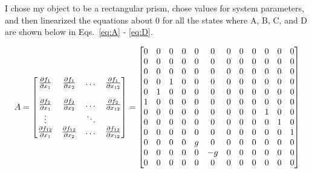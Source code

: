 \documentclass{article}
\begin{document}
I chose my object to be a rectangular prism, chose values for system parameters, and then linearized the equations about 0 for all the states where A, B, C, and D are shown below in Eqs.~\ref{eq:A} - \ref{eq:D}.

\begin{equation}\label{eq:A}
A=
  \begin{bmatrix}
    \frac{\partial f_1}{\partial x_1} & \frac{\partial f_1}{\partial x_2} & \dots  & \frac{\partial f_1}{\partial x_{12}} \\ \\
    \frac{\partial f_2}{\partial x_1} & \frac{\partial f_2}{\partial x_2} & \dots  & \frac{\partial f_2}{\partial x_{12}} \\
    \vdots &  & \ddots  &  \\
    \frac{\partial f_{12}}{\partial x_1} & \frac{\partial f_{12}}{\partial x_2} & \dots  & \frac{\partial f_{12}}{\partial x_{12}}
  \end{bmatrix}=
  \setcounter{MaxMatrixCols}{20}
  \begin{bmatrix}
  0 & 0 & 0 & 0 & 0 & 0 & 0 & 0 & 0 & 0 & 0 & 0 \\ 
  0 & 0 & 0 & 0 & 0 & 0 & 0 & 0 & 0 & 0 & 0 & 0 \\ 
  0 & 0 & 0 & 0 & 0 & 0 & 0 & 0 & 0 & 0 & 0 & 0 \\
  0 & 0 & 1 & 0 & 0 & 0 & 0 & 0 & 0 & 0 & 0 & 0 \\ 
  0 & 1 & 0 & 0 & 0 & 0 & 0 & 0 & 0 & 0 & 0 & 0 \\ 
  1 & 0 & 0 & 0 & 0 & 0 & 0 & 0 & 0 & 0 & 0 & 0 \\ 
  0 & 0 & 0 & 0 & 0 & 0 & 0 & 0 & 0 & 1 & 0 & 0 \\ 
  0 & 0 & 0 & 0 & 0 & 0 & 0 & 0 & 0 & 0 & 1 & 0 \\ 
  0 & 0 & 0 & 0 & 0 & 0 & 0 & 0 & 0 & 0 & 0 & 1 \\ 
  0 & 0 & 0 & 0 & g & 0 & 0 & 0 & 0 & 0 & 0 & 0 \\ 
  0 & 0 & 0 & 0 & 0 & -g & 0 & 0 & 0 & 0 & 0 & 0 \\ 
  0 & 0 & 0 & 0 & 0 & 0 & 0 & 0 & 0 & 0 & 0 & 0 \\  
  \end{bmatrix}
\end{equation}
\end{document}
